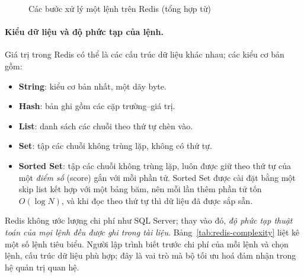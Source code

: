 \begin{figure}[H]
    \centering
    \caption{Các bước xử lý một lệnh trên Redis (tổng hợp từ)}
    \label{fig:redis-flow}
\end{figure}

\paragraph{Kiểu dữ liệu và độ phức tạp của lệnh.}
Giá trị trong Redis có thể là các cấu trúc dữ liệu khác nhau; các kiểu cơ bản gồm:
\begin{itemize}
    \item \textbf{String}: kiểu cơ bản nhất, một dãy byte.
    \item \textbf{Hash}: bản ghi gồm các cặp trường--giá trị.
    \item \textbf{List}: danh sách các chuỗi theo thứ tự chèn vào.
    \item \textbf{Set}: tập các chuỗi không trùng lặp, không có thứ tự.
    \item \textbf{Sorted Set}: tập các chuỗi không trùng lặp, luôn được giữ theo thứ tự của một \textit{điểm số} (score) gắn với mỗi phần tử. Sorted Set được cài đặt bằng một skip list kết hợp với một bảng băm, nên mỗi lần thêm phần tử tốn $O(\log N)$, và khi đọc theo thứ tự thì dữ liệu đã được sắp sẵn.
\end{itemize}

Redis không ước lượng chi phí như SQL Server; thay vào đó, \textit{độ phức tạp thuật toán của mọi lệnh đều được ghi trong tài liệu}. Bảng~\ref{tab:redis-complexity} liệt kê một số lệnh tiêu biểu. Người lập trình biết trước chi phí của mỗi lệnh và chọn lệnh, cấu trúc dữ liệu phù hợp; đây là vai trò mà bộ tối ưu hoá đảm nhận trong hệ quản trị quan hệ.

